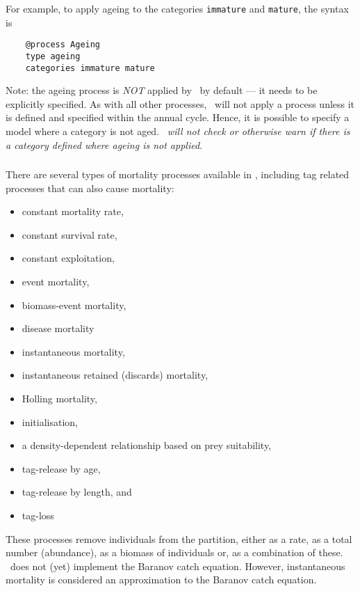 For example, to apply ageing to the categories \texttt{immature} and \texttt{mature}, the syntax is

{\small{\begin{verbatim}
	@process Ageing
	type ageing
	categories immature mature
	\end{verbatim}}}

Note: the ageing process is \emph{NOT} applied by \CNAME\ by default --- it needs to be explicitly specified. As with all other processes, \CNAME\ will not apply a process unless it is defined and specified within the annual cycle. Hence, it is possible to specify a model where a category is not aged. \emph{\CNAME\ will not check or otherwise warn if there is a category defined where ageing is not applied.}

\subsubsection{\label{sec:Process-Mortality}}

There are several types of mortality processes available in \CNAME, including tag related processes that can also cause mortality:

\begin{itemize}
	\item constant mortality rate,
    \item constant survival rate,
	\item constant exploitation,
	\item event mortality,
	\item biomass-event mortality,
	\item disease mortality
	\item instantaneous mortality,
	\item instantaneous retained (discards) mortality,
	\item Holling mortality,
	\item initialisation,
	\item a density-dependent relationship based on prey suitability,
	\item tag-release by age,
	\item tag-release by length, and	
	\item tag-loss
\end{itemize}

These processes remove individuals from the partition, either as a rate, as a total number (abundance), as a biomass of individuals or, as a combination of these. \CNAME\ does not (yet) implement the Baranov catch equation. However, instantaneous mortality is considered an approximation to the Baranov catch equation.

